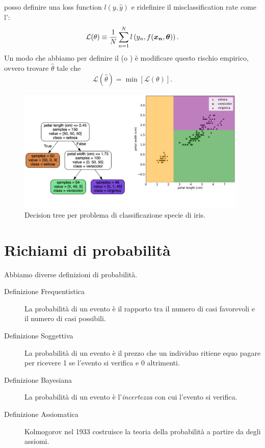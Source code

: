 \documentclass[10pt]{article}
\begin{document}
\begin{example}
posso definire una loss function $l(y, \hat{y})$ e ridefinire il
misclassification rate come l':
\begin{equation}\label{eq:misclassification-rate}
\mathcal{L}(\theta) \equiv \frac{1}{N}\sum_{n=1}^N l\left( y_n, f(\bm{x_n}, \bm{\theta}) \right).
\end{equation}
Un modo che abbiamo per definire il  (o ) è
modificare questo rischio empirico, ovvero trovare $\hat{\theta}$ tale che
\begin{equation}
\mathcal{L}(\hat{\theta}) = \min[\mathcal{L}(\theta)].
\end{equation}

\begin{figure}
\includegraphics[width=0.98\textwidth]{Images/iris_decision_tree.PNG}
\caption{Decision tree per problema di classificazione specie di iris.}\label{fig:iris-decision-tree}
\end{figure}

\end{example}

\section{Richiami di probabilità}
Abbiamo diverse definizioni di probabilità.
\begin{description}
\item[Definizione Frequentistica] La probabilità di un evento è il rapporto tra il numero di casi favorevoli e il numero di casi possibili.
\item[Definizione Soggettiva] La probabilità di un evento è il prezzo che un individuo ritiene equo pagare per ricevere 1 se l'evento si verifica e 0 altrimenti.
\item[Definizione Bayesiana] La probabilità di un evento è l'\textit{incertezza} con cui l'evento si verifica.
\item[Definizione Assiomatica] Kolmogorov nel 1933 costruisce la teoria della probabilità a partire da degli assiomi.
\end{description}
\end{document}
